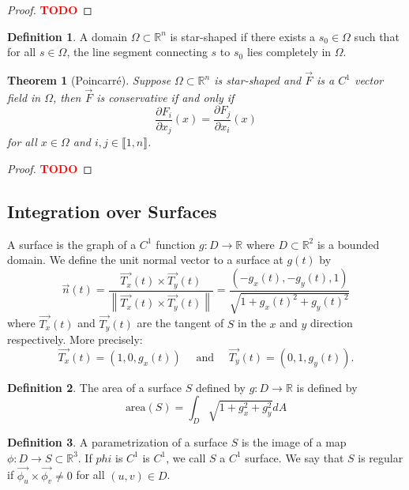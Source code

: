 \documentclass{article}
\theoremstyle{plain}
\newtheorem{theorem}{Theorem}[subsection]
\theoremstyle{definition}
\newtheorem*{definition}{Definition}
\newcommand{\R}{\mathbb{R}}
\newcommand{\Iint}[2]{\llbracket #1 , #2 \rrbracket}
\newcommand{\td}{\textcolor{red}{\textbf{TODO}}}
\newcommand{\norm}[1]{\left\lVert#1 \right\rVert}
\begin{document}
\begin{proof}
    \td 
\end{proof}

\begin{definition}
    A domain $\Omega \subset \R^n$ is star-shaped if there exists a $s_0 \in \Omega$ such that for all $s \in \Omega$, the line segment connecting $s$ to $s_0$ lies completely in $\Omega$.
\end{definition}

\begin{theorem}[Poincarré]
    Suppose $\Omega \subset \R^n$ is star-shaped and $\vec{F}$ is a $C^1$ vector field in $\Omega$, then $\vec{F}$ is conservative if and only if
    $$\frac{\partial F_i}{\partial x_j}(x) = \frac{\partial F_j}{\partial x_i}(x)$$
    for all $x \in \Omega$ and $i,j \in \Iint{1}{n}$.
\end{theorem}

\begin{proof}
    \td 
\end{proof}

\subsection{Integration over Surfaces}

A surface is the graph of a $C^1$ function $g : D \to \R$ where $D \subset \R^2$ is a bounded domain. We define the unit normal vector to a surface at $g(t)$ by
$$\vec{n}(t) = \frac{\vec{T_x}(t)\times \vec{T_y}(t)}{\norm{\vec{T_x}(t)\times \vec{T_y}(t)}} = \frac{(-g_x(t), -g_y(t), 1)}{\sqrt{1 + g_x(t)^2 + g_y(t)^2}}$$
where $\vec{T_x}(t)$ and $\vec{T_y}(t)$ are the tangent of $S$ in the $x$ and $y$ direction respectively. More precisely:
$$\vec{T_x}(t) = (1, 0, g_x(t)) \quad \text{ and } \quad \vec{T_y}(t) = (0, 1, g_y(t)).$$

\begin{definition}
    The area of a surface $S$ defined by $g : D \to \R$ is defined by
    $$\text{area}(S) = \int_D \sqrt{1 + g_x^2 + g_y^2}dA$$
\end{definition}

\begin{definition}
    A parametrization of a surface $S$ is the image of a map $\phi : D \to S \subset \R^3$. If $phi$ is $C^1$ is $C^1$, we call $S$ a $C^1$ surface. We say that $S$ is regular if $\vec{\phi_u} \times \vec{\phi_v} \neq 0$ for all $(u,v) \in D$.  
\end{definition}
\end{document}
